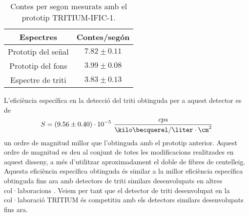 \begin{table}[htbp]
\centering{}%
\begin{tabular}{cc}
\toprule 
Espectres & Contes/segón  \tabularnewline
\midrule
\midrule 
Prototip del señal & $7.82 \pm 0.11$ \tabularnewline
Prototip del fons & $3.99 \pm 0.08$ \tabularnewline  
Espectre de triti & $3.83 \pm 0.13$ \tabularnewline
\bottomrule
\end{tabular}
\caption{Contes per segon mesurats amb el prototip TRITIUM-IFIC-1.}
\label{tab:ContesPerSegonTRITIUMIFIC1}
\end{table}

L'eficiència específica en la detecció del triti obtinguda per a aquest detector es de
$$S = (9.56 \pm 0.40)\cdot{} 10^{-5}~\frac{cps}{\kilo\becquerel/\liter \cdot{} \cm^{2}}$$
un ordre de magnitud millor que l'obtinguda amb el prototip anterior. Aquest ordre de magnitud es deu al conjunt de totes les modificacions realitzades en aquest disseny, a més d'utilitzar aproximadament el doble de fibres de centelleig. Aquesta eficiència específica obtinguda és similar a la millor eficiència específica obtinguda fins ara amb detectors de triti similars desenvolupats en altres col·laboracions \cite{Hofstetter1, Hofstetter2}. Veiem per tant que el detector de triti desenvolupat en la col·laboració TRITIUM és competitiu amb els detectors similars desenvolupats fins ara.